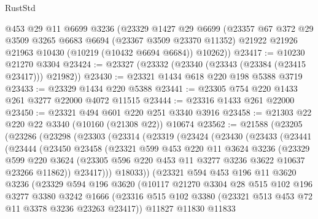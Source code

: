 \begin{lexlean}{RustStd}
\begin{coremodule}
    @453
    @29
    @11
    @6699
    @3236
    (@23329
      @1427
      @29
      @6699
      (@23357
        @67
        @372
        @29
        @3509
        @3265
        @6683
        @6694
        (@23367 @3509 @23370 @11352)
        @21922
        @21926
        @21963
        @10430
        (@10219 (@10432 @6694 @6684))
        @10262))
@23417 := @10230 @21270 @3304
@23424 := @23327 (@23332 (@23340 (@23343 (@23384 (@23415 @23417))) @21982))
@23430 := @23321 @1434 @618 @220 @198 @5388 @3719
@23433 := @23329 @1434 @220 @5388
@23441 := @23305 @754 @220 @1433 @261 @3277 @22000 @4072 @11515
@23444 := @23316 @1433 @261 @22000
@23450 := @23321 @494 @601 @220 @251 @3340 @3916
@23458 := @21303 @22 @220 @22 @3340 (@10160 (@21308 @22)) @10674
@23562 := @21588
    (@23205
      (@23286
        (@23298
          (@23303
            (@23314
              (@23319
                (@23424
                  (@23430
                    (@23433
                      (@23441
                        (@23444
                          (@23450
                            @23458
                            (@23321
                              @599
                              @453
                              @220
                              @11
                              @3624
                              @3236
                              (@23329
                                @599
                                @220
                                @3624
                                (@23305 @596 @220 @453 @11 @3277 @3236 @3622 @10637 @23266 @11862))
                              @23417)))
                        @18033))
                    (@23321
                      @594
                      @453
                      @196
                      @11
                      @3620
                      @3236
                      (@23329
                        @594
                        @196
                        @3620
                        (@10117
                          @21270
                          @3304
                          @28
                          @515
                          @102
                          @196
                          @3277
                          @3380
                          @3242
                          @1666
                          (@23316
                            @515
                            @102
                            @3380
                            (@23321 @513 @453 @72 @11 @3378 @3236 @23263 @23417))
                          @11827
                          @11830
                          @11833

\end{coremodule}
\end{lexlean}
